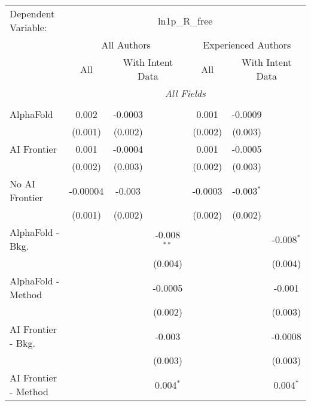 \begingroup
\centering
\begin{tabular}{lcccccc}
   \tabularnewline \midrule \midrule
   Dependent Variable: & \multicolumn{6}{c}{ln1p\_R\_free}\\
 & \multicolumn{3}{c}{All Authors} & \multicolumn{3}{c}{Experienced Authors} \\
\cmidrule(lr){2-4} \cmidrule(lr){5-7}
 & \multicolumn{1}{c}{All} & \multicolumn{2}{c}{With Intent Data} & \multicolumn{1}{c}{All} & \multicolumn{2}{c}{With Intent Data} \\
\cmidrule(lr){2-2} \cmidrule(lr){3-4} \cmidrule(lr){5-5} \cmidrule(lr){6-7}
 & \multicolumn{6}{c}{\textit{All Fields}} \\ \\
   AlphaFold               & 0.002    & -0.0003 &                & 0.001   & -0.0009      &   \\   
                           & (0.001)  & (0.002) &                & (0.002) & (0.003)      &   \\   
   AI Frontier             & 0.001    & -0.0004 &                & 0.001   & -0.0005      &   \\   
                           & (0.002)  & (0.003) &                & (0.002) & (0.003)      &   \\   
   No AI Frontier          & -0.00004 & -0.003  &                & -0.0003 & -0.003$^{*}$ &   \\   
                           & (0.001)  & (0.002) &                & (0.002) & (0.002)      &   \\   
   AlphaFold - Bkg.        &          &         & -0.008$^{**}$  &         &              & -0.008$^{*}$\\   
                           &          &         & (0.004)        &         &              & (0.004)\\   
   AlphaFold - Method      &          &         & -0.0005        &         &              & -0.001\\   
                           &          &         & (0.002)        &         &              & (0.003)\\   
   AI Frontier - Bkg.      &          &         & -0.003         &         &              & -0.0008\\   
                           &          &         & (0.003)        &         &              & (0.003)\\   
   AI Frontier - Method    &          &         & 0.004$^{*}$    &         &              & 0.004$^{*}$\\   

\end{tabular}
